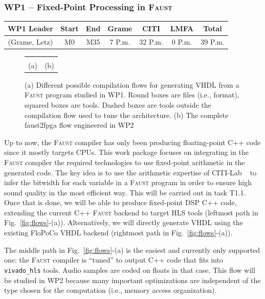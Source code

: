 \documentclass[a4paper,9pt]{extarticle}
\newcommand{\F}{\textsc{Faust}}
\begin{document}
\subsubsection{WP1 -- Fixed-Point Processing in \F{}}
\label{subsubsec:wp1}

\begin{center}
\begin{tabular}{c | c c | c c c | c}
\textbf{WP1 Leader} & \textbf{Start} & \textbf{End} & \textbf{Grame} & \textbf{CITI} & \textbf{LMFA} & \textbf{Total}\\
\hline
(Grame, Letz) & M0 & M35 & 7 P.m. & 32 P.m. & 0 P.m. & 39 P.m.
\end{tabular}
\end{center}

\begin{figure}[ht]
  \begin{center}
    \begin{tabular}{cc}   &  \\
      (a) & (b)
    \end{tabular}
  \end{center}
  \caption{(a) Different possible compilation flows for generating VHDL from a \F{} program studied in WP1. Round boxes are files (i.e., format), squared boxes are tools. Dashed boxes are tools outside the compilation flow used to tune the architecture. (b) The complete faust2fpga flow engineered in WP2}
  \label{fig:flows}
  \label{fig:synflow}

\end{figure}

Up to now, the \F{} compiler has only been producing floating-point C++ code since it mostly targets CPUs. This work package focuses on integrating in the \F{} compiler the required technologies to use fixed-point arithmetic in the generated code. The key idea is to use the arithmetic expertise of CITI-Lab ~\cite{volkova:hal-01561052} to infer the bitwidth for each variable in a \F{} program in order to ensure high sound quality in the most efficient way. This will be carried out in task T1.1. Once that is done, we will be able to produce fixed-point DSP C++ code, extending the current C++ \F{} backend to target HLS tools (leftmost path in Fig.~\ref{fig:flows}-(a)). Alternatively, we will directly generate VHDL using the existing FloPoCo VHDL backend (rightmost path in Fig.~\ref{fig:flows}-(a)).

The middle path in Fig.~\ref{fig:flows}-(a) is the easiest and currently only supported one: the \F{} compiler is ``tuned'' to output C++ code that fits into {\tt vivado\_hls} tools. Audio samples are coded on floats in that case. This flow will be studied in WP2 because many important optimizations are independent of the type chosen for the computation (i.e., memory access organization).
\end{document}
